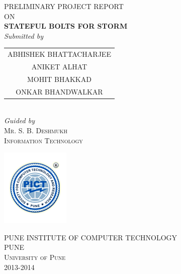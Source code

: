 \begin{titlepage}
\begin{center}

\thispagestyle{empty}
\textsc{PRELIMINARY PROJECT REPORT}\\[3mm]
\textsc{ON}\\[3mm]
{\Large \textsc{\textbf{STATEFUL BOLTS FOR STORM}}}\\[5mm]
\vspace*{10mm}
{\small \textit{Submitted by}}\\[3mm]
\vspace*{10mm}
\begin{tabular}{c} 
ABHISHEK BHATTACHARJEE\\
ANIKET ALHAT\\
MOHIT BHAKKAD\\
ONKAR BHANDWALKAR\\
\end{tabular}
\vspace*{5mm}\\
\vspace*{8mm}
{\small \textit{Guided by}} \\[3mm]
{\textsc{Mr. S. B. Deshmukh}}\\[2mm]
\vspace*{18mm}
{\textsc{Information Technology}} \\[5mm]
\begin{center}
\includegraphics[scale=0.5]{../img/logo} \\[2mm]
\end{center}
{\textsc{PUNE INSTITUTE OF COMPUTER TECHNOLOGY}}  \\[4mm]
{\textsc{PUNE}}  \\[4mm]
{\textsc{University of Pune}}  \\[4mm]
{\textsc{2013-2014}}  \\[4mm]
\end{center}

\end{titlepage}
